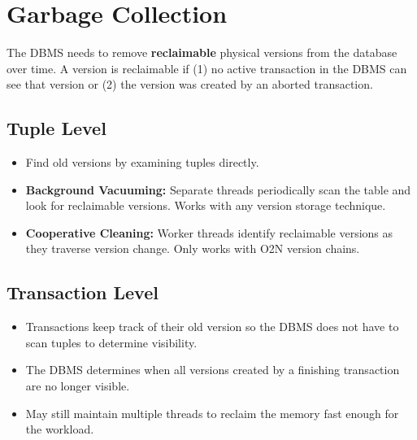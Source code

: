 \documentclass[11pt]{article}
\begin{document}
\section{Garbage Collection}
The DBMS needs to remove \textbf{reclaimable} physical versions from the database over 
time. A version is reclaimable if (1) no active transaction in the DBMS can see that version or 
(2) the version was created by an aborted transaction.

\subsection*{Tuple Level}
\begin{itemize}
    \item
    Find old versions by examining tuples directly.
    
    \item \textbf{Background Vacuuming:}
    Separate threads periodically scan the table and look for 
    reclaimable versions. Works with any version storage technique.
    
    \item \textbf{Cooperative Cleaning:}
    Worker threads identify reclaimable versions as they 
    traverse version change. Only works with O2N version chains.
\end{itemize}

\subsection*{Transaction Level}
\begin{itemize}
    \item
    Transactions keep track of their old version so the DBMS does not have to scan tuples 
    to determine visibility.
    
    \item
    The DBMS determines when all versions created by a finishing transaction are no 
    longer visible.
    
    \item
    May still maintain multiple threads to reclaim the memory fast enough for the workload.
\end{itemize}
\end{document}
